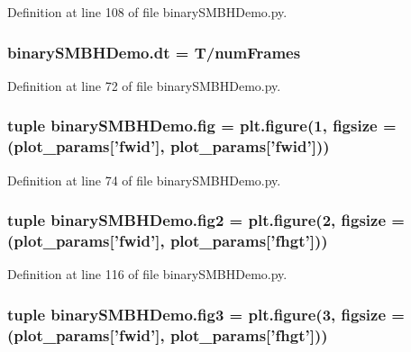 Definition at line 108 of file binary\-S\-M\-B\-H\-Demo.\-py.

\hypertarget{namespacebinary_s_m_b_h_demo_a0e8710373f07d4050517407141858465}{
\subsubsection[{dt}]{\setlength{\rightskip}{0pt plus 5cm}binary\-S\-M\-B\-H\-Demo.\-dt = {\bf T}/{\bf num\-Frames}}}\label{namespacebinary_s_m_b_h_demo_a0e8710373f07d4050517407141858465}


Definition at line 72 of file binary\-S\-M\-B\-H\-Demo.\-py.

\hypertarget{namespacebinary_s_m_b_h_demo_a52c6580cc4f2120bbe561e444362eb31}{
\subsubsection[{fig}]{\setlength{\rightskip}{0pt plus 5cm}tuple binary\-S\-M\-B\-H\-Demo.\-fig = plt.\-figure(1, figsize = (plot\-\_\-params\mbox{[}'fwid'\mbox{]}, plot\-\_\-params\mbox{[}'fwid'\mbox{]}))}}\label{namespacebinary_s_m_b_h_demo_a52c6580cc4f2120bbe561e444362eb31}


Definition at line 74 of file binary\-S\-M\-B\-H\-Demo.\-py.

\hypertarget{namespacebinary_s_m_b_h_demo_a362c9d47e0bf1ae36450b55e3337519e}{
\subsubsection[{fig2}]{\setlength{\rightskip}{0pt plus 5cm}tuple binary\-S\-M\-B\-H\-Demo.\-fig2 = plt.\-figure(2, figsize = (plot\-\_\-params\mbox{[}'fwid'\mbox{]}, plot\-\_\-params\mbox{[}'fhgt'\mbox{]}))}}\label{namespacebinary_s_m_b_h_demo_a362c9d47e0bf1ae36450b55e3337519e}


Definition at line 116 of file binary\-S\-M\-B\-H\-Demo.\-py.

\hypertarget{namespacebinary_s_m_b_h_demo_aa3b8a615ddcf0fa6a8b6cada1f4e600b}{
\subsubsection[{fig3}]{\setlength{\rightskip}{0pt plus 5cm}tuple binary\-S\-M\-B\-H\-Demo.\-fig3 = plt.\-figure(3, figsize = (plot\-\_\-params\mbox{[}'fwid'\mbox{]}, plot\-\_\-params\mbox{[}'fhgt'\mbox{]}))}}\label{namespacebinary_s_m_b_h_demo_aa3b8a615ddcf0fa6a8b6cada1f4e600b}


